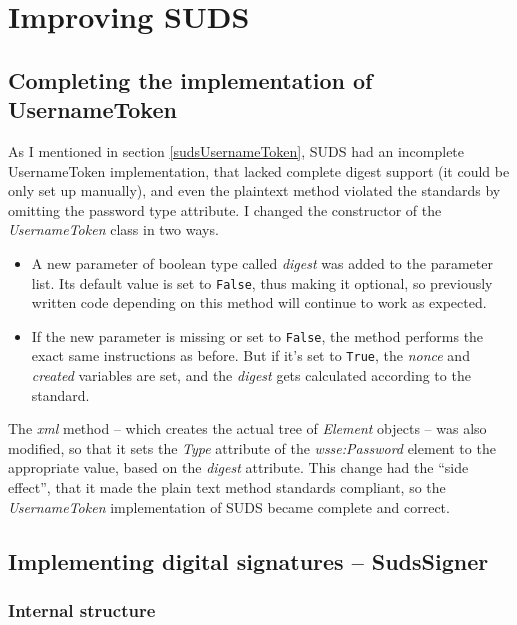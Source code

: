 \chapter{Improving SUDS}

\section{Completing the implementation of UsernameToken}

As I mentioned in section \ref{sudsUsernameToken}, SUDS had an incomplete UsernameToken implementation, that lacked complete digest support (it could be only set up manually), and even the plaintext method violated the standards by omitting the password type attribute. I changed the constructor of the \emph{UsernameToken} class in two ways.

\begin{itemize}
 \item A new parameter of boolean type called \emph{digest} was added to the parameter list. Its default value is set to \verb|False|, thus making it optional, so previously written code depending on this method will continue to work as expected.
 \item If the new parameter is missing or set to \verb|False|, the method performs the exact same instructions as before. But if it's set to \verb|True|, the \emph{nonce} and \emph{created} variables are set, and the \emph{digest} gets calculated according to the standard.
\end{itemize}

The \emph{xml} method -- which creates the actual tree of \emph{Element} objects -- was also modified, so that it sets the \emph{Type} attribute of the \emph{wsse:Password} element to the appropriate value, based on the \emph{digest} attribute. This change had the ``side effect'', that it made the plain text method standards compliant, so the \emph{UsernameToken} implementation of SUDS became complete and correct.

\section{Implementing digital signatures -- SudsSigner}

\subsection{Internal structure}

